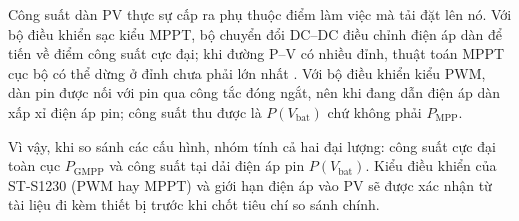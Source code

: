 Công suất dàn PV thực sự cấp ra phụ thuộc điểm làm việc mà tải đặt lên nó. Với bộ điều khiển sạc kiểu MPPT, bộ chuyển đổi DC--DC điều chỉnh điện áp dàn để tiến về điểm công suất cực đại; khi đường P--V có nhiều đỉnh, thuật toán MPPT cục bộ có thể dừng ở đỉnh chưa phải lớn nhất \cite{thanh}. Với bộ điều khiển kiểu PWM, dàn pin được nối với pin qua công tắc đóng ngắt, nên khi đang dẫn điện áp dàn xấp xỉ điện áp pin; công suất thu được là \(P(V_{\mathrm{bat}})\) chứ không phải \(P_{\mathrm{MPP}}\).

Vì vậy, khi so sánh các cấu hình, nhóm tính cả hai đại lượng: công suất cực đại toàn cục \(P_{\mathrm{GMPP}}\) và công suất tại dải điện áp pin \(P(V_{\mathrm{bat}})\). Kiểu điều khiển của ST-S1230 (PWM hay MPPT) và giới hạn điện áp vào PV sẽ được xác nhận từ tài liệu đi kèm thiết bị trước khi chốt tiêu chí so sánh chính.
